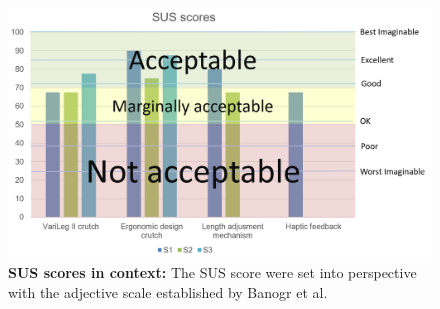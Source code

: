 \documentclass[conference,a4paper]{IEEEtran}
\begin{document}

 



\begin{figure}
    \centering
    \includegraphics[width=1.0\columnwidth]{Images/Discussion/SUS_adjectives.PNG}
    \caption{\textbf{SUS scores in context:} The SUS score were set into perspective with the adjective scale established by Banogr et al.\cite{bangor}}
    \label{fig:SUSadjectives}
\end{figure}
\end{document}
